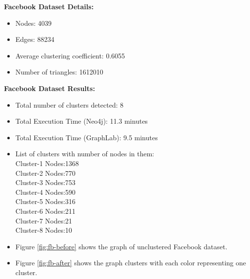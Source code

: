\textbf{Facebook Dataset Details:}
\begin{itemize}
	\item
	Nodes: 4039
	\item
	Edges: 88234
	\item
	Average clustering coefficient:	0.6055
	\item
	Number of triangles:	1612010
\end{itemize}
\noindent

\textbf{Facebook Dataset Results:}
\begin{itemize}
	\item
	Total number of clusters detected: 8
	\item
	Total Execution Time (Neo4j): 11.3 minutes
	\item
	Total Execution Time (GraphLab): 9.5 minutes
	\item
	List of clusters with number of nodes in them:\\
	Cluster-1 Nodes:1368\\
	Cluster-2 Nodes:770\\
	Cluster-3 Nodes:753\\
	Cluster-4 Nodes:590\\
	Cluster-5 Nodes:316\\
	Cluster-6 Nodes:211\\
	Cluster-7 Nodes:21\\
	Cluster-8 Nodes:10	
	\item
	Figure \ref{fig:fb-before} shows the graph of unclustered Facebook dataset.
	\item
	Figure \ref{fig:fb-after} shows the graph clusters with each color representing one cluster.
\end{itemize}
